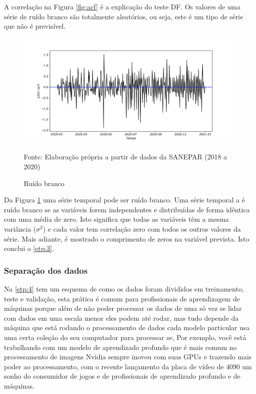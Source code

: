A correlação na Figura \ref{fig:acf} é a explicação do teste DF. Os valores de uma série de ruído branco são totalmente aleatórios, ou seja, este é um tipo de série que não é previsível.

\begin{figure}[H]
	\centering
	\caption{Ruído branco}
	\label{fig:ruido-branco}
	\includegraphics[width=1\linewidth]{Resultados/Figuras/ruido-branco}
	
	Fonte: Elaboração própria a partir de dados da SANEPAR (2018 a 2020)
\end{figure}

Da Figura \ref{fig:ruido-branco} uma série temporal pode ser ruído branco.
Uma série temporal a é ruído branco se as variáveis forem independentes e distribuídas de forma idêntica com uma média de zero.
Isto significa que todas as variáveis têm a mesma variância ($\sigma^2$) e cada valor tem correlação zero com todos os outros valores da série.
Mais adiante, é mostrado o comprimento de zeros na variável prevista. Isto conclui o \ref{etp:3}.

\subsubsection{Separa\c c\~ao dos dados}

Na \ref{etp:4} tem um esquema de como os dados foram divididos em treinamento, teste e validação, esta prática é comum para profissionais de aprendizagem de máquinas porque além de não poder processar os dados de uma só vez se lidar com dados em uma escala menor eles podem até rodar, mas tudo depende da máquina que está rodando o processamento de dados cada modelo particular usa uma certa coleção do seu computador para processar se, Por exemplo, você está trabalhando com um modelo de aprendizado profundo que é mais comum no processamento de imagens Nvidia sempre inovou com suas GPUs e trazendo mais poder ao processamento, com o recente lançamento da placa de vídeo de $4090$ um sonho do consumidor de jogos e de profissionais de aprendizado profundo e de máquinas.

